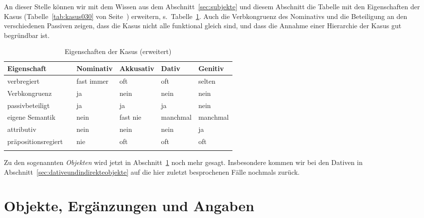 An dieser Stelle können wir mit dem Wissen aus dem Abschnitt~\ref{sec:subjekte} und diesem Abschnitt die Tabelle mit den Eigenschaften der Kasus (Tabelle~\ref{tab:kasus030} von Seite~\pageref{tab:kasus030}) erweitern, s.\ Tabelle~\ref{tab:bekommenpassiv157}.
Auch die Verbkongruenz des Nominativs und die Beteiligung an den verschiedenen Passiven zeigen, dass die Kasus nicht alle funktional gleich sind, und dass die Annahme einer Hierarchie der Kasus gut begründbar ist.

\begin{table}[!htbp]
  \begin{tabular}{lp{0.1cm}llll}
    \lsptoprule
     \textbf{Eigenschaft} && \textbf{Nominativ} & \textbf{Akkusativ} & \textbf{Dativ} & \textbf{Genitiv} \\
    \hline
    verbregiert && fast immer & oft & oft & selten \\
    Verbkongruenz && ja & nein & nein & nein \\
    passivbeteiligt && ja & ja & ja & nein \\
    eigene Semantik && nein & fast nie & manchmal & manchmal \\
    attributiv && nein & nein & nein & ja \\
    präpositionsregiert && nie & oft & oft & oft \\
    \lspbottomrule
  \end{tabular}
  \caption{Eigenschaften der Kasus (erweitert)}
  \label{tab:bekommenpassiv157}
\end{table}

Zu den sogenannten \textit{Objekten} wird jetzt in Abschnitt~\ref{sec:objekteergaenzungenundangaben} noch mehr gesagt.
Insbesondere kommen wir bei den Dativen in Abschnitt~\ref{sec:dativeundindirekteobjekte} auf die hier zuletzt besprochenen Fälle nochmals zurück.


\section{Objekte, Ergänzungen und Angaben}
\label{sec:objekteergaenzungenundangaben}

